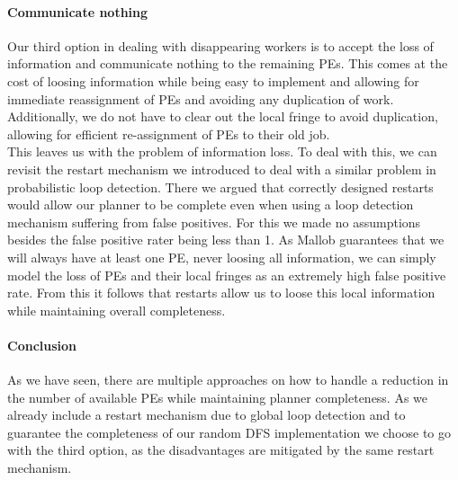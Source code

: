 \paragraph{Communicate nothing}
Our third option in dealing with disappearing workers is to accept the loss of information and communicate nothing to the remaining PEs. This comes at the cost of loosing information while being easy to implement and allowing for immediate reassignment of PEs and avoiding any duplication of work. Additionally, we do not have to clear out the local fringe to avoid duplication, allowing for efficient re-assignment of PEs to their old job. \\
This leaves us with the problem of information loss. To deal with this, we can revisit the restart mechanism we introduced to deal with a similar problem in probabilistic loop detection. There we argued that correctly designed restarts would allow our planner to be complete even when using a loop detection mechanism suffering from false positives. For this we made no assumptions besides the false positive rater being less than 1. As Mallob guarantees that we will always have at least one PE, never loosing all information, we can simply model the loss of PEs and their local fringes as an extremely high false positive rate. From this it follows that restarts allow us to loose this local information while maintaining overall completeness.

\paragraph{Conclusion}
As we have seen, there are multiple approaches on how to handle a reduction in the number of available PEs while maintaining planner completeness. As we already include a restart mechanism due to global loop detection and to guarantee the completeness of our random DFS implementation we choose to go with the third option, as the disadvantages are mitigated by the same restart mechanism.

\begin{comment}
- deal with disappearing workers
- either design a scheme to preserve global knowledge or be able to deal with loss of information
- in our case we deal with loss of information
- two parts: loosing information stored in the fringe of a terminated node and loosing messages of dying workers
- loosing information stored in the fringes:
- multiple options:
- send back nothing, loose parts of the search space
- send back the root, redo parts of the search (also, loop detection!)
- send back everything, takes much communication (also may duplicate the search space on resume)

- our loop detection scheme already implies that we loose parts of the search space and we have measures in place to deal with this fact (restarts)
- for this reason we go with this approach
\end{comment}
			
